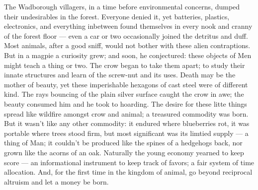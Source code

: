 The Wadborough villagers, in a time before environmental concerns, dumped their undesirables in the forest. Everyone denied it, yet batteries, plastics, electronics, and everything inbetween found themselves in every nook and cranny of the forest floor — even a car or two occasionally joined the detritus and duff. Most animals, after a good sniff, would not bother with these alien contraptions. But in a magpie a curiosity grew; and soon, he conjectured: these objects of Men might teach a thing or two. The crow began to take them apart; to study their innate structures and learn of the screw-nut and its uses. Death may be the mother of beauty, yet these imperishable hexagons of cast steel were of different kind. The rays bouncing of the plain silver surface caught the crow in awe; the beauty consumed him and he took to hoarding. The desire for these litte things spread like wildfire amongst crow and animal; a treasured commodity was born. But it wasn't like any other commodity: it endured where blueberries rot, it was portable where trees stood firm, but most significant was its limtied supply — a thing of Man; it couldn't be produced like the spines of a hedgehogs back, nor grown like the acorns of an oak. Naturally the young economy yearned to keep score — an informational instrument to keep track of favors; a fair system of time allocation. And, for the first time in the kingdom of animal, go beyond reciprocal altruism and let a money be born.




